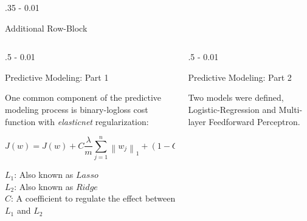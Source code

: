 \documentclass{postertheme}\usepackage[]{graphicx}\usepackage[]{color}
\begin{document}
\begin{frame}
\begin{columns}[onlytextwidth]
\begin{column}{.35 \textwidth - 0.01 \textwidth}
\begin{block}{Additional Row-Block}
    \end{block}
  \end{column}
  
\end{columns}


\begin{columns}[onlytextwidth]
  
  \begin{column}{.5 \textwidth - 0.01 \textwidth}
    \begin{block}{Predictive Modeling: Part 1}
        
      One common component of the predictive modeling process is binary-logloss cost function 
      with \textit{elasticnet} regularization:

      \begin{equation}
          J(w) =  J(w) + C \frac{\lambda}{m} \sum_{j=1}^n \left \lVert w_j \right\rVert_1 + (1 - C)
          \frac{\lambda}{2m} \sum_{j=1}^n \left \lVert w_j \right\rVert_2^2
      \end{equation}

      \footnotesize
      \noindent
      $L_{1}$: Also known as $Lasso$  \\
      $L_{2}$: Also known as $Ridge$ \\
      $C$: A coefficient to regulate the effect between $L_{1}$ and $L_{2}$
        
    \end{block}
  \end{column}

  \begin{column}{.5 \textwidth - 0.01 \textwidth}
    \begin{block}{Predictive Modeling: Part 2}
    
      Two models were defined, Logistic-Regression and Multi-layer Feedforward Perceptron. 
      

\end{block}
\end{column}
\end{columns}
\end{frame}
\end{document}
